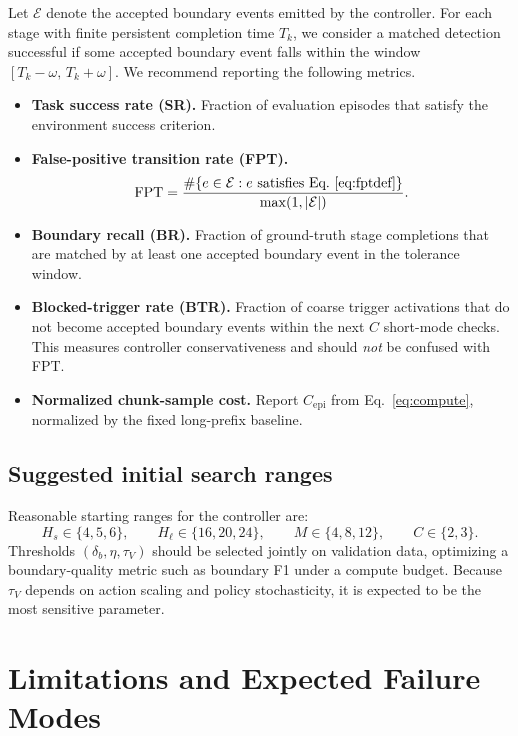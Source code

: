 \documentclass[10pt]{article}
\newcommand{\Hs}{H_s}
\newcommand{\Hl}{H_\ell}
\newcommand{\Msamples}{M}
\begin{document}
Let $\mathcal{E}$ denote the accepted boundary events emitted by the controller.
For each stage with finite persistent completion time $T_k$, we consider a
matched detection successful if some accepted boundary event falls within the
window $[T_k-\omega,\,T_k+\omega]$.
We recommend reporting the following metrics.
\begin{itemize}[leftmargin=1.5em, itemsep=0.15em]
  \item \textbf{Task success rate (SR).}
  Fraction of evaluation episodes that satisfy the environment success criterion.
  \item \textbf{False-positive transition rate (FPT).}
  \begin{equation}
    \mathrm{FPT}
    = \frac{\#\{e\in\mathcal{E}: e \text{ satisfies Eq.~\eqref{eq:fptdef}}\}}
    {\max(1,|\mathcal{E}|)}.
    \label{eq:metric_fpt}
  \end{equation}
  \item \textbf{Boundary recall (BR).}
  Fraction of ground-truth stage completions that are matched by at least one
  accepted boundary event in the tolerance window.
  \item \textbf{Blocked-trigger rate (BTR).}
  Fraction of coarse trigger activations that do not become accepted boundary
  events within the next $C$ short-mode checks.
  This measures controller conservativeness and should \emph{not} be confused
  with FPT.
  \item \textbf{Normalized chunk-sample cost.}
  Report $C_{\mathrm{epi}}$ from Eq.~\eqref{eq:compute}, normalized by the fixed
  long-prefix baseline.
\end{itemize}

\subsection{Suggested initial search ranges}

Reasonable starting ranges for the controller are:
\[
  \Hs \in \{4,5,6\}, \qquad
  \Hl \in \{16,20,24\}, \qquad
  \Msamples \in \{4,8,12\}, \qquad
  C \in \{2,3\}.
\]
Thresholds $(\delta_b,\eta,\tau_V)$ should be selected jointly on validation data,
optimizing a boundary-quality metric such as boundary F1 under a compute budget.
Because $\tau_V$ depends on action scaling and policy stochasticity, it is
expected to be the most sensitive parameter.

\section{Limitations and Expected Failure Modes}
\label{sec:limitations}
\end{document}
